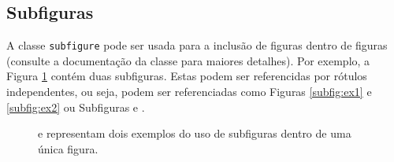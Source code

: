 \subsection{Subfiguras}
\label{subsec:subfigs} 
A classe \verb|subfigure| pode ser usada para a inclusão de figuras dentro de figuras (consulte a documentação da classe para maiores detalhes). Por exemplo, a Figura \ref{fig:subfiguras} contém duas subfiguras. Estas podem ser referencidas por rótulos independentes, ou seja, podem ser referenciadas como Figuras \ref{subfig:ex1} e \ref{subfig:ex2} ou Subfiguras  e .
\begin{figure}[h]
 \centering
   \qquad
   \caption{{} e {} representam dois exemplos do uso de subfiguras dentro de uma única figura.}
  \label{fig:subfiguras}
\end{figure}

